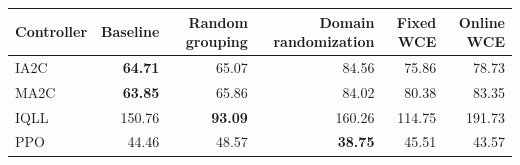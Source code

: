\begin{tabular}{lrrrrr}
\hline
Controller & Baseline & Random grouping & Domain randomization & Fixed WCE & Online WCE \\
\hline
IA2C & \textbf{64.71} & 65.07 & 84.56 & 75.86 & 78.73 \\
MA2C & \textbf{63.85} & 65.86 & 84.02 & 80.38 & 83.35 \\
IQLL & 150.76 & \textbf{93.09} & 160.26 & 114.75 & 191.73 \\
PPO & 44.46 & 48.57 & \textbf{38.75} & 45.51 & 43.57 \\
\hline
\end{tabular}
